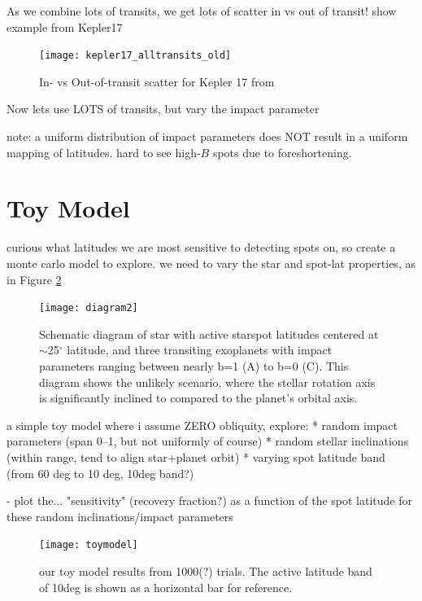 \documentclass[preprint2]{aastex61}
\begin{document}
As we combine lots of transits, we get lots of scatter in vs out of transit!
show example from Kepler17


\begin{figure}[!t]
\centering
\texttt{[image: kepler17\_alltransits\_old]}
\caption{
In- vs Out-of-transit scatter for Kepler 17 from \citep{davenport_phd}
}
\label{fig:kep17}
\end{figure}

Now lets use LOTS of transits, but vary the impact parameter

note: a uniform distribution of impact parameters does NOT result in a uniform mapping of latitudes. hard to see high-$B$ spots due to foreshortening.




\section{Toy Model}
curious what latitudes we are most sensitive to detecting spots on, so create a monte carlo model to explore. we need to vary the star and spot-lat properties, as in Figure \ref{fig:diagram2}

\begin{figure}[!t]
\centering
\texttt{[image: diagram2]}
\caption{
Schematic diagram of star with active starspot latitudes centered at $\sim$25$^\circ$ latitude, and three transiting exoplanets with impact parameters ranging between nearly b=1 (A) to  b=0 (C). This diagram shows the unlikely scenario, where the stellar rotation axis is significantly inclined to compared to the planet's orbital axis. 
}
\label{fig:diagram2}
\end{figure}



a simple toy model where i assume ZERO obliquity, explore:
* random impact parameters (span 0--1, but not uniformly of course)
* random stellar inclinations (within range, tend to align star+planet orbit)
* varying spot latitude band (from 60 deg to 10 deg, 10deg band?)

- plot the... "sensitivity" (recovery fraction?) as a function of the spot latitude for these random inclinations/impact parameters

\begin{figure}[!t]
\centering
\texttt{[image: toymodel]}
\caption{
our toy model results from 1000(?) trials. The active latitude band of 10deg is shown as a horizontal bar for reference.
}
\label{fig:toymodel}
\end{figure}
\end{document}
